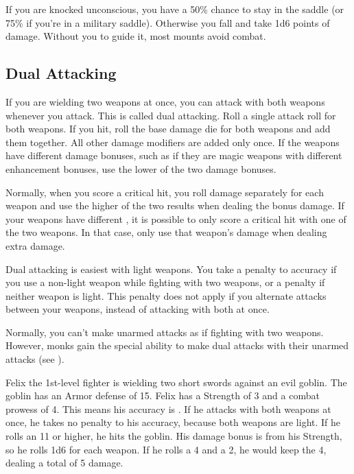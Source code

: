          If you are knocked unconscious, you have a 50\% chance to stay in the saddle (or 75\% if you're in a military saddle). Otherwise you fall and take 1d6 points of damage. Without you to guide it, most mounts avoid combat.

    \subsection{Dual Attacking}\label{Dual Attacking}
        If you are wielding two weapons at once, you can attack with both weapons whenever you attack. This is called dual attacking. Roll a single attack roll for both weapons. If you hit, roll the base damage die for both weapons and add them together. All other damage modifiers are added only once. If the weapons have different damage bonuses, such as if they are magic weapons with different enhancement bonuses, use the lower of the two damage bonuses.

         Normally, when you score a critical hit, you roll damage separately for each weapon and use the higher of the two results when dealing the bonus damage. If your weapons have different , it is possible to only score a critical hit with one of the two weapons. In that case, only use that weapon's damage when dealing extra damage.

         Dual attacking is easiest with light weapons. You take a  penalty to accuracy if you use a non-light weapon while fighting with two weapons, or a  penalty if neither weapon is light. This penalty does not apply if you alternate attacks between your weapons, instead of attacking with both at once.

         Normally, you can't make unarmed attacks as if fighting with two weapons. However, monks gain the special ability to make dual attacks with their unarmed attacks (see ).

         Felix the 1st-level fighter is wielding two short swords against an evil goblin. The goblin has an Armor defense of 15. Felix has a Strength of 3 and a combat prowess of 4. This means his accuracy is . If he attacks with both weapons at once, he takes no penalty to his accuracy, because both weapons are light. If he rolls an 11 or higher, he hits the goblin. His damage bonus is  from his Strength, so he rolls 1d6 for each weapon. If he rolls a 4 and a 2, he would keep the 4, dealing a total of 5 damage.

